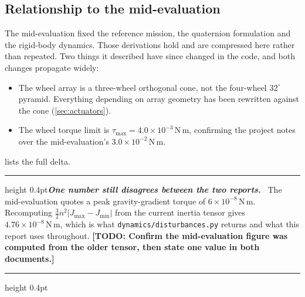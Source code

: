 \documentclass[conference,10pt,a4paper]{IEEEtran}
\newcommand{\remarkrule}{\par\nobreak\vspace{2pt}%
  \hrule height 0.4pt\vspace{4pt}\nobreak}
\newenvironment{cautionbox}[1][Caveat]
  {\par\medskip\remarkrule\noindent\small\textbf{\textit{#1.}}\ \ignorespaces}
  {\par\vspace{3pt}\hrule height 0.4pt\par\medskip\ignorespacesafterend}
\newcommand{\TODO}[1]{\textbf{[TODO: #1]}}
\newcommand{\TODO}[1]{}
\newcommand{\unit}[1]{\ensuremath{\,\mathrm{#1}}}
\begin{document}
\subsection{Relationship to the mid-evaluation}

The mid-evaluation fixed the reference mission, the quaternion formulation and
the rigid-body dynamics. Those derivations hold and are compressed here rather
than repeated. Two things it described have since changed in the code, and
both changes propagate widely:

\begin{itemize}
\item The wheel array is a three-wheel orthogonal cone, not the four-wheel
$32^\circ$ pyramid. Everything depending on array geometry has been rewritten
against the cone (\cref{sec:actuators}).
\item The wheel torque limit is $\tau_\text{max}=4.0\times10^{-3}\unit{N\,m}$,
confirming the project notes over the mid-evaluation's
$3.0\times10^{-2}\unit{N\,m}$.
\end{itemize}

 lists the full delta.

\begin{cautionbox}[One number still disagrees between the two reports]
The mid-evaluation quotes a peak gravity-gradient torque of
$6\times10^{-8}\unit{N\,m}$. Recomputing $\tfrac{3}{2}n^2|J_\text{max}-J_\text{min}|$
from the current inertia tensor gives $4.76\times10^{-8}\unit{N\,m}$, which is
what \texttt{dynamics/disturbances.py} returns and what this report uses
throughout. \TODO{Confirm the mid-evaluation figure was computed from the older
tensor, then state one value in both documents.}
\end{cautionbox}
\end{document}
